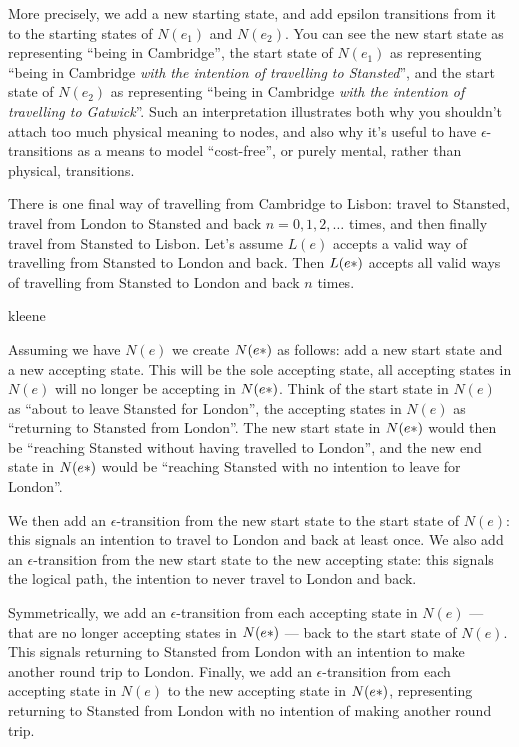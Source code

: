 More precisely, we add a new starting state, and add epsilon transitions from it to the starting states of $N(e_1)$ and $N(e_2)$. You can see the new start state as representing ``being in Cambridge'', the start state of $N(e_1)$ as representing ``being in Cambridge \textit{with the intention of travelling to Stansted}'', and the start state of $N(e_2)$ as representing ``being in Cambridge \textit{with the intention of travelling to Gatwick}''. Such an interpretation illustrates both why you shouldn't attach too much physical meaning to nodes, and also why it's useful to have $\epsilon$-transitions as a means to model ``cost-free'', or purely mental, rather than physical, transitions.

There is one final way of travelling from Cambridge to Lisbon: travel to Stansted, travel from London to Stansted and back $n = 0, 1, 2, \ldots$ times, and then finally travel from Stansted to Lisbon. Let's assume $L(e)$ accepts a valid way of travelling from Stansted to London and back. Then $L(e\*)$ accepts all valid ways of travelling from Stansted to London and back $n$ times. 

\begin{center}
    {kleene}
\end{center}

Assuming we have $N(e)$ we create $N(e\*)$ as follows: add a new start state and a new accepting state. This will be the sole accepting state, all accepting states in $N(e)$ will no longer be accepting in $N(e\*)$. Think of the start state in $N(e)$ as ``about to leave Stansted for London'', the accepting states in $N(e)$ as ``returning to Stansted from London''. The new start state in $N(e\*)$ would then be ``reaching Stansted without having travelled to London'', and the new end state in $N(e\*)$ would be ``reaching Stansted with no intention to leave for London''. 

We then add an $\epsilon$-transition from the new start state to the start state of $N(e)$: this signals an intention to travel to London and back at least once. We also add an $\epsilon$-transition from the new start state to the new accepting state: this signals the logical path, the intention to never travel to London and back. 

Symmetrically, we add an $\epsilon$-transition from each accepting state in $N(e)$ --- that are no longer accepting states in $N(e\*)$ --- back to the start state of $N(e)$. This signals returning to Stansted from London with an intention to make another round trip to London. Finally, we add an $\epsilon$-transition from each accepting state in $N(e)$ to the new accepting state in $N(e\*)$, representing returning to Stansted from London with no intention of making another round trip.

